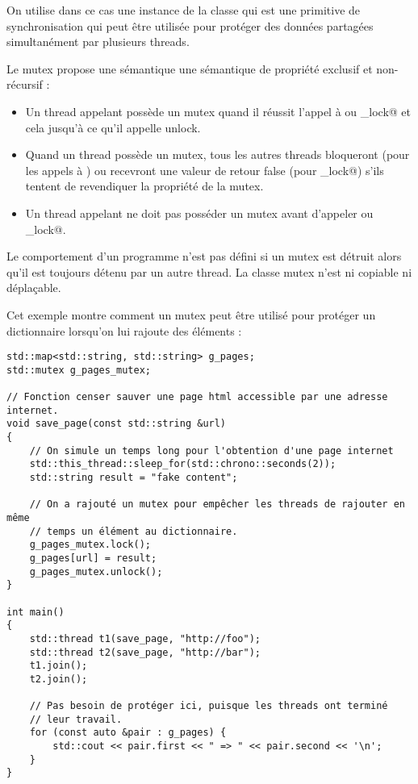 \documentclass[fleqn,11pt]{article}
\begin{document}
On utilise dans ce cas une instance de la classe \lstinline@mutex@ qui est une primitive de synchronisation qui peut être utilisée pour protéger des données partagées simultanément par plusieurs threads.

Le mutex propose une sémantique une sémantique de propriété exclusif et non-récursif :

\begin{itemize}
\item Un thread appelant possède un mutex quand il réussit l'appel à 
\lstinline@lock@ ou \lstinline@try_lock@ et cela jusqu'à ce qu'il appelle unlock.
\item Quand un thread possède un mutex, tous les autres threads bloqueront (pour les appels à \lstinline@lock@) ou  recevront une valeur de retour false (pour \lstinline@try_lock@) s'ils tentent de revendiquer la propriété de la mutex.
\item Un thread appelant ne doit pas posséder un mutex avant d'appeler \lstinline@lock@ ou \lstinline@try_lock@.
\end{itemize}

Le comportement d'un programme n'est pas défini si un mutex est détruit alors qu'il est toujours détenu par un autre thread. La classe mutex n'est ni copiable ni déplaçable.

Cet exemple montre comment un mutex peut être utilisé pour protéger un dictionnaire lorsqu'on lui rajoute 
des éléments :

\begin{lstlisting}
std::map<std::string, std::string> g_pages;
std::mutex g_pages_mutex;

// Fonction censer sauver une page html accessible par une adresse internet. 
void save_page(const std::string &url)
{
    // On simule un temps long pour l'obtention d'une page internet
    std::this_thread::sleep_for(std::chrono::seconds(2));
    std::string result = "fake content";
 
    // On a rajouté un mutex pour empêcher les threads de rajouter en même
    // temps un élément au dictionnaire.
    g_pages_mutex.lock();
    g_pages[url] = result;
    g_pages_mutex.unlock();
}
 
int main() 
{
    std::thread t1(save_page, "http://foo");
    std::thread t2(save_page, "http://bar");
    t1.join();
    t2.join();

    // Pas besoin de protéger ici, puisque les threads ont terminé
    // leur travail. 
    for (const auto &pair : g_pages) {
        std::cout << pair.first << " => " << pair.second << '\n';
    }
}
\end{lstlisting}
\end{document}
